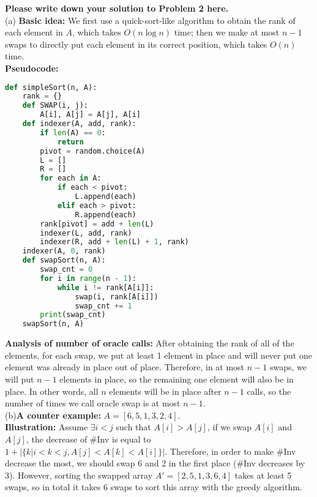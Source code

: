 \documentclass[11pt,twoside]{article}
\newenvironment{solution}{{\par\noindent\it Solution.}}{}
\begin{document}
\begin{solution}
\textbf{Please write down your solution to Problem 2 here.}\\
(a) \label{2a}\textbf{Basic idea: } We first use a quick-sort-like algorithm to obtain the rank of each element in $A$, which takes $O(n\log n)$ time;
then we make at most $n-1$ swaps to directly put each element in its correct position, which takes $O(n)$ time.
\vspace{5pt}\\
\textbf{Pseudocode: }
\begin{lstlisting}[language=Python]
def simpleSort(n, A):
    rank = {}
    def SWAP(i, j):
        A[i], A[j] = A[j], A[i]
    def indexer(A, add, rank):
        if len(A) == 0:
            return
        pivot = random.choice(A)
        L = []
        R = []
        for each in A:
            if each < pivot:
                L.append(each)
            elif each > pivot:
                R.append(each)
        rank[pivot] = add + len(L)
        indexer(L, add, rank)
        indexer(R, add + len(L) + 1, rank)
    indexer(A, 0, rank)
    def swapSort(n, A):
        swap_cnt = 0
        for i in range(n - 1):
            while i != rank[A[i]]:
                swap(i, rank[A[i]])
                swap_cnt += 1
        print(swap_cnt)
    swapSort(n, A)
\end{lstlisting}
\vspace{5pt}
\textbf{Analysis of number of oracle calls: }After obtaining the rank of all of the elements, 
for each swap, we put at least 1 element in place and will never put one element was already in place out of place.
Therefore, in at most $n-1$ swaps, we will put $n-1$ elements in place, so the remaining one element will also be in place.
In other words, all $n$ elements will be in place after $n-1$ calls, so the number of times we call oracle swap is at most $n-1$.
\vspace{5pt}\\
(b)\textbf{A counter example: }$A=[6,5,1,3,2,4]$.
\vspace{5pt}\\
\textbf{Illustration: }Assume $\exists i<j$ such that $A[i]>A[j]$, if we swap $A[i]$ and $A[j]$, the decrease of \#Inv is equal to
$1+|\{k|i<k<j,A[j]<A[k]<A[i]\}|$. Therefore, in order to make \#Inv decrease the most, we should swap 6 and 2 in the first place (\#Inv decreases by 3).
However, sorting the swapped array $A'=[2,5,1,3,6,4]$ takes at least 5 swaps, so in total it takes 6 swaps to sort this array with the greedy algorithm.
\vspace{5pt}\\

\end{solution}
\end{document}
